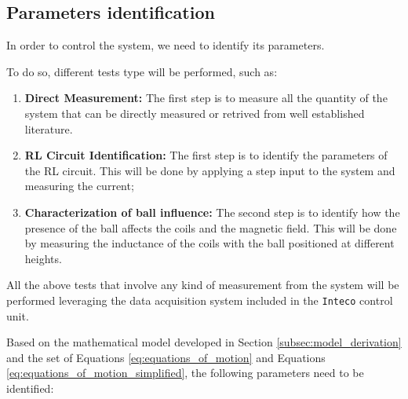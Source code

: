 \subsection{Parameters identification}
\label{subsec:parameters_identification}

In order to control the system, we need to identify its parameters.

To do so, different tests type will be performed, such as:

\begin{enumerate}
    \item \textbf{Direct Measurement:} The first step is to measure all the quantity of the system that can be directly measured or retrived from well established literature.
    \item \textbf{RL Circuit Identification:} The first step is to identify the parameters of the RL circuit. This will be done by applying a step input to the system and measuring the current;
    \item \textbf{Characterization of ball influence:} The second step is to identify how the presence of the ball affects the coils and the magnetic field. This will be done by measuring the inductance of the coils with the ball positioned at different heights.
\end{enumerate}

All the above tests that involve any kind of measurement from the system will be performed leveraging the data acquisition system included in the \texttt{Inteco} control unit.

Based on the mathematical model developed in Section \ref{subsec:model_derivation} and the set of Equations \ref{eq:equations_of_motion} and Equations \ref{eq:equations_of_motion_simplified}, the following parameters need to be identified:

